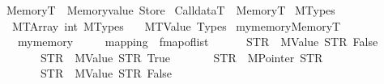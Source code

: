\begin{isabellebody}
\ MemoryT\ {\isacharequal}{\kern0pt}\ {\isachardoublequoteopen}Memoryvalue\ Store{\isachardoublequoteclose}\isanewline
\isanewline
{}\isamarkupfalse%
\ CalldataT\ {\isacharequal}{\kern0pt}\ MemoryT\isanewline
\isanewline
{}\isamarkupfalse%
\ MTypes\ {\isacharequal}{\kern0pt}\isanewline
\ \ MTArray\ int\ MTypes\isanewline
\ \ {\isacharbar}{\kern0pt}\ MTValue\ Types%
\isadelimdocument
%
\endisadelimdocument
%
\isatagdocument
%
\isamarkuptrue%
%
\endisatagdocument
{\isafolddocument}%
%
\isadelimdocument
%
\endisadelimdocument
{}\isamarkupfalse%
\ mymemory{\isacharcolon}{\kern0pt}{\isacharcolon}{\kern0pt}MemoryT\isanewline
\ \ \ {\isachardoublequoteopen}mymemory\ {\isasymequiv}\isanewline
\ \ \ \ {\isasymlparr}mapping\ {\isacharequal}{\kern0pt}\ fmap{\isacharunderscore}{\kern0pt}of{\isacharunderscore}{\kern0pt}list\isanewline
\ \ \ \ \ \ {\isacharbrackleft}{\kern0pt}{\isacharparenleft}{\kern0pt}STR\ {\isacharprime}{\kern0pt}{\isacharprime}{\kern0pt}{}{\isachardot}{\kern0pt}{}{\isachardot}{\kern0pt}{}{\isacharprime}{\kern0pt}{\isacharprime}{\kern0pt}{\isacharcomma}{\kern0pt}\ MValue\ STR\ {\isacharprime}{\kern0pt}{\isacharprime}{\kern0pt}False{\isacharprime}{\kern0pt}{\isacharprime}{\kern0pt}{\isacharparenright}{\kern0pt}{\isacharcomma}{\kern0pt}\isanewline
\ \ \ \ \ \ \ {\isacharparenleft}{\kern0pt}STR\ {\isacharprime}{\kern0pt}{\isacharprime}{\kern0pt}{}{\isachardot}{\kern0pt}{}{\isachardot}{\kern0pt}{}{\isacharprime}{\kern0pt}{\isacharprime}{\kern0pt}{\isacharcomma}{\kern0pt}\ MValue\ STR\ {\isacharprime}{\kern0pt}{\isacharprime}{\kern0pt}True{\isacharprime}{\kern0pt}{\isacharprime}{\kern0pt}{\isacharparenright}{\kern0pt}{\isacharcomma}{\kern0pt}\isanewline
\ \ \ \ \ \ \ {\isacharparenleft}{\kern0pt}STR\ {\isacharprime}{\kern0pt}{\isacharprime}{\kern0pt}{}{\isachardot}{\kern0pt}{}{\isacharprime}{\kern0pt}{\isacharprime}{\kern0pt}{\isacharcomma}{\kern0pt}\ MPointer\ STR\ {\isacharprime}{\kern0pt}{\isacharprime}{\kern0pt}{}{\isachardot}{\kern0pt}{}{\isacharprime}{\kern0pt}{\isacharprime}{\kern0pt}{\isacharparenright}{\kern0pt}{\isacharcomma}{\kern0pt}\isanewline
\ \ \ \ \ \ \ {\isacharparenleft}{\kern0pt}STR\ {\isacharprime}{\kern0pt}{\isacharprime}{\kern0pt}{}{\isachardot}{\kern0pt}{}{\isachardot}{\kern0pt}{}{\isacharprime}{\kern0pt}{\isacharprime}{\kern0pt}{\isacharcomma}{\kern0pt}\ MValue\ STR\ {\isacharprime}{\kern0pt}{\isacharprime}{\kern0pt}False{\isacharprime}{\kern0pt}{\isacharprime}{\kern0pt}{\isacharparenright}{\kern0pt}{\isacharcomma}{\kern0pt}\isanewline

\end{isabellebody}
